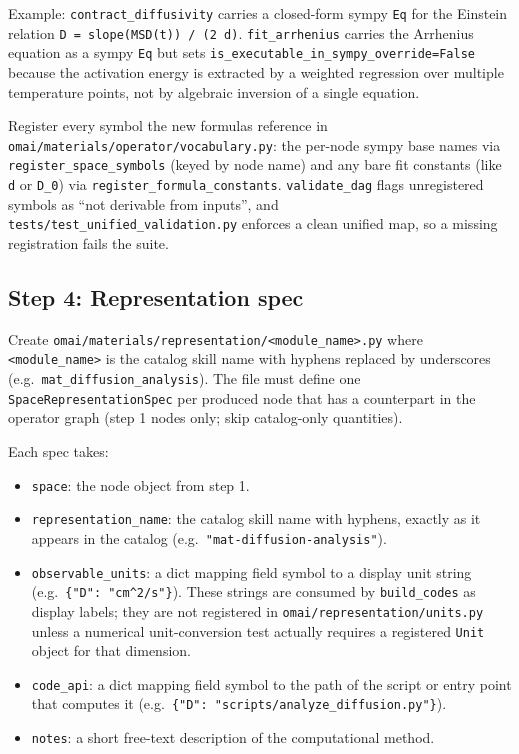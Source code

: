 \documentclass[11pt,a4paper]{article}
\begin{document}
Example: \texttt{contract\_diffusivity} carries a closed-form sympy \texttt{Eq} for
the Einstein relation \texttt{D = slope(MSD(t)) / (2 d)}. \texttt{fit\_arrhenius}
carries the Arrhenius equation as a sympy \texttt{Eq} but sets
\texttt{is\_executable\_in\_sympy\_override=False} because the activation energy is
extracted by a weighted regression over multiple temperature points, not by
algebraic inversion of a single equation.

Register every symbol the new formulas reference in
\texttt{omai/materials/operator/vocabulary.py}: the per-node sympy base names via
\texttt{register\_space\_symbols} (keyed by node name) and any bare fit constants
(like \texttt{d} or \texttt{D\_0}) via \texttt{register\_formula\_constants}.
\texttt{validate\_dag} flags unregistered symbols as ``not derivable from inputs'',
and \texttt{tests/test\_unified\_validation.py} enforces a clean unified map, so a
missing registration fails the suite.

\subsection{Step 4: Representation spec}

Create \texttt{omai/materials/representation/<module\_name>.py} where
\texttt{<module\_name>} is the catalog skill name with hyphens replaced by
underscores (e.g.\ \texttt{mat\_diffusion\_analysis}). The file must define one
\texttt{SpaceRepresentationSpec} per produced node that has a counterpart in the
operator graph (step 1 nodes only; skip catalog-only quantities).

Each spec takes:
\begin{itemize}[leftmargin=2em]
  \item \texttt{space}: the node object from step 1.
  \item \texttt{representation\_name}: the catalog skill name with hyphens, exactly
        as it appears in the catalog (e.g.\ \texttt{"mat-diffusion-analysis"}).
  \item \texttt{observable\_units}: a dict mapping field symbol to a display unit
        string (e.g.\ \texttt{\{"D": "cm\^{}2/s"\}}). These strings are consumed by
        \texttt{build\_codes} as display labels; they are not registered in
        \texttt{omai/representation/units.py} unless a numerical unit-conversion test
        actually requires a registered \texttt{Unit} object for that dimension.
  \item \texttt{code\_api}: a dict mapping field symbol to the path of the script or
        entry point that computes it (e.g.\ \texttt{\{"D":
        "scripts/analyze\_diffusion.py"\}}).
  \item \texttt{notes}: a short free-text description of the computational method.
\end{itemize}
\end{document}
